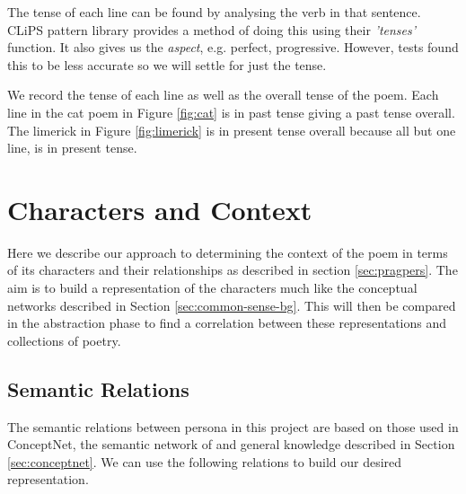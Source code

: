 The tense of each line can be found by analysing the verb in that sentence. CLiPS pattern library provides a method of doing this using their \textit{'tenses'} function. It also gives us the \textit{aspect}, e.g. perfect, progressive. However, tests found this to be less accurate so we will settle for just the tense.

We record the tense of each line as well as the overall tense of the poem. Each line in the cat poem in Figure \ref{fig:cat} is in past tense giving a past tense overall. The limerick in Figure \ref{fig:limerick} is in present tense overall because all but one line, is in present tense. 


\section{Characters and Context}
Here we describe our approach to determining the context of the poem in terms of its characters and their relationships as described in section \ref{sec:pragpers}. The aim is to build a representation of the characters much like the conceptual networks described in Section \ref{sec:common-sense-bg}. This will then be compared in the abstraction phase to find a correlation between these representations and collections of poetry.

\subsection{Semantic Relations}
The semantic relations between persona in this project are based on those used in ConceptNet, the semantic network of and general knowledge described in Section \ref{sec:conceptnet}. We can use the following relations to build our desired representation.

